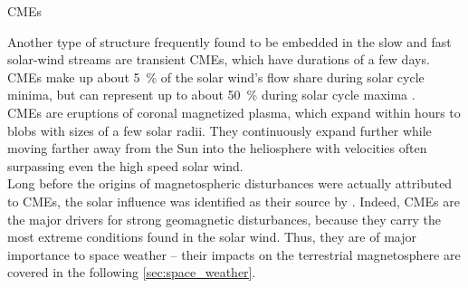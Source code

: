 
CMEs

Another type of structure frequently found to be embedded in the slow and fast solar-wind streams are transient CMEs, which have durations of a few days. CMEs make up about \SI{5}{\percent} of the solar wind's flow share during solar cycle minima, but can represent up to about \SI{50}{\percent} during solar cycle maxima \citep{Richardson2012}.\\

CMEs are eruptions of coronal magnetized plasma, which expand within hours to blobs with sizes of a few solar radii. They continuously expand further while moving farther away from the Sun into the heliosphere with velocities often surpassing even the high speed solar wind.\\

Long before the origins of magnetospheric disturbances were actually attributed to CMEs, the solar influence was identified as their source by \citet{Carrington1859}. Indeed, CMEs are the major drivers for strong geomagnetic disturbances, because they carry the most extreme conditions found in the solar wind. Thus, they are of major importance to space weather -- their impacts on the terrestrial magnetosphere are covered in the following \autoref{sec:space_weather}.\\

